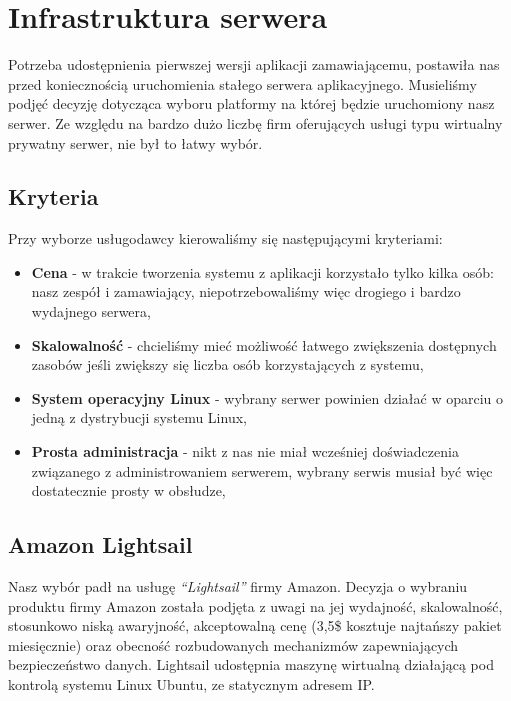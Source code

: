 \documentclass[licencjacka]{pracamgr}
\begin{document}
\newpage

\chapter{Infrastruktura serwera}\label{r:infrastruktura} 

Potrzeba udostępnienia pierwszej wersji aplikacji zamawiającemu, postawiła nas przed koniecznością uruchomienia stałego serwera aplikacyjnego. Musieliśmy podjęć decyzję dotycząca wyboru platformy na której będzie uruchomiony nasz serwer. Ze względu na bardzo dużo liczbę firm oferujących usługi typu wirtualny prywatny serwer, nie był to łatwy wybór.

\section{Kryteria}
Przy wyborze usługodawcy kierowaliśmy się następującymi kryteriami:
\begin{itemize}
    \item \textbf{Cena} - w trakcie tworzenia systemu z aplikacji korzystało tylko kilka osób: nasz zespół i
    zamawiający, niepotrzebowaliśmy więc drogiego i bardzo wydajnego serwera,
    \item \textbf{Skalowalność} - chcieliśmy mieć możliwość łatwego zwiększenia dostępnych zasobów jeśli
    zwiększy się liczba osób korzystających z systemu,
    \item \textbf{System operacyjny Linux} - wybrany serwer powinien działać w oparciu o jedną z dystrybucji
    systemu Linux,
    \item \textbf{Prosta administracja} - nikt z nas nie miał wcześniej doświadczenia związanego z administrowaniem serwerem, wybrany serwis musiał być więc dostatecznie prosty w obsłudze,
\end{itemize}{}

\section{Amazon Lightsail}

Nasz wybór padł na usługę \textit{``Lightsail''} firmy Amazon. Decyzja o wybraniu produktu firmy Amazon została podjęta z uwagi na jej wydajność, skalowalność, stosunkowo niską awaryjność, akceptowalną cenę (3,5\$ kosztuje najtańszy pakiet miesięcznie) oraz obecność rozbudowanych mechanizmów zapewniających bezpieczeństwo danych. Lightsail udostępnia maszynę wirtualną działającą pod kontrolą systemu Linux Ubuntu, ze statycznym adresem IP.
\end{document}
